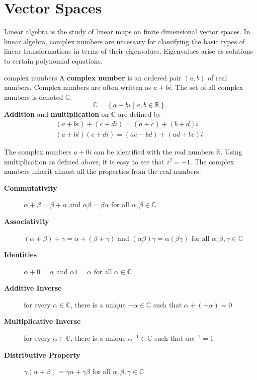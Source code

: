 \documentclass{article}
\newcommand{\real}{\mathbb{R}}
\newcommand{\complex}{\mathbb{C}}
\newcommand{\set}[2]{\left\{#1\;\vert\;#2\right\}}
\begin{document}
\section{Vector Spaces}
Linear algebra is the study of linear maps on finite dimensional vector spaces.
In linear algebra, complex numbers are necessary for classifying the basic types
of linear transformations in terms of their eigenvalues. Eigenvalues arise as
solutions to certain polynomial equations.

\begin{defn}{complex numbers}
    A \textbf{complex number} is an ordered pair $(a,b)$ of real numbers.
    Complex numbers are often written as $a+bi$. The set of all complex numbers
    is denoted $\complex$.
    \[
        \complex = \set{a+bi}{a,b\in\real}
    \]
    \textbf{Addition} and \textbf{multiplication} on $ \complex $ are defined by
    \begin{gather*}
        (a+bi) + (c+di) = (a+c) + (b+d)i \\
        (a+bi)(c+di) = (ac-bd) + (ad+bc)i
    \end{gather*}
\end{defn}

\noindent The complex numbers $ a+0i $ can be identified with the real numbers $ \real
$. Using multiplication as defined above, it is easy to see that $ i^2 = -1 $.
The complex numbers inherit almost all the properties from the real numbers.
\begin{description}
    \item[ \textbf{Commutativity}] $ \alpha+\beta = \beta +\alpha $ and $ 
        \alpha\beta = \beta\alpha $ for all $ \alpha,\beta\in\complex $ 
    \item[ \textbf{Associativity}] $ (\alpha+\beta)+\gamma = 
        \alpha+(\beta+\gamma) $ and $ (\alpha\beta)\gamma =
        \alpha(\beta\gamma) $ for all $ \alpha,\beta,\gamma\in\complex $ 
    \item[ \textbf{Identities}] $ \alpha+0 = \alpha $ and $ \alpha 1 = \alpha $
        for all $ \alpha\in\complex $ 
    \item[ \textbf{Additive Inverse}] for every $\alpha\in\complex$, there is a
        unique $ -\alpha\in\complex $ such that $ \alpha +(-\alpha) = 0 $ 
    \item[ \textbf{Multiplicative Inverse}] for every $\alpha\in\complex$, there is a
        unique $ \alpha^{-1}\in\complex $ such that $ \alpha\alpha^{-1} = 1 $ 
    \item[ \textbf{Distributive Property}] $ \gamma(\alpha+\beta) = \gamma\alpha 
        + \gamma\beta$ for all $ \alpha,\beta,\gamma\in\complex $ 
\end{description}
\end{document}
